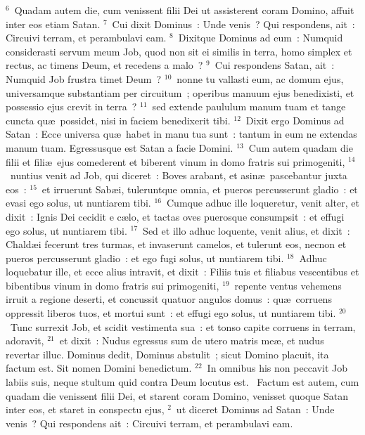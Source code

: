 ${}^{6}$~Quadam autem die, cum venissent filii Dei ut assisterent coram Domino, affuit inter eos etiam Satan.
${}^{7}$~Cui dixit Dominus~: Unde venis~? Qui respondens, ait~: Circuivi terram, et perambulavi eam.
${}^{8}$~Dixitque Dominus ad eum~: Numquid considerasti servum meum Job, quod non sit ei similis in terra, homo simplex et rectus, ac timens Deum, et recedens a malo~?
${}^{9}$~Cui respondens Satan, ait~: Numquid Job frustra timet Deum~?
${}^{10}$~nonne tu vallasti eum, ac domum ejus, universamque substantiam per circuitum~; operibus manuum ejus benedixisti, et possessio ejus crevit in terra~?
${}^{11}$~sed extende paululum manum tuam et tange cuncta qu\ae\ possidet, nisi in faciem benedixerit tibi.
${}^{12}$~Dixit ergo Dominus ad Satan~: Ecce universa qu\ae\ habet in manu tua sunt~: tantum in eum ne extendas manum tuam. Egressusque est Satan a facie Domini.
${}^{13}$~Cum autem quadam die filii et fili\ae\ ejus comederent et biberent vinum in domo fratris sui primogeniti,
${}^{14}$~nuntius venit ad Job, qui diceret~: Boves arabant, et asin\ae\ pascebantur juxta eos~:
${}^{15}$~et irruerunt Sab\ae i, tuleruntque omnia, et pueros percusserunt gladio~: et evasi ego solus, ut nuntiarem tibi.
${}^{16}$~Cumque adhuc ille loqueretur, venit alter, et dixit~: Ignis Dei cecidit e c\ae lo, et tactas oves puerosque consumpsit~: et effugi ego solus, ut nuntiarem tibi.
${}^{17}$~Sed et illo adhuc loquente, venit alius, et dixit~: Chald\ae i fecerunt tres turmas, et invaserunt camelos, et tulerunt eos, necnon et pueros percusserunt gladio~: et ego fugi solus, ut nuntiarem tibi.
${}^{18}$~Adhuc loquebatur ille, et ecce alius intravit, et dixit~: Filiis tuis et filiabus vescentibus et bibentibus vinum in domo fratris sui primogeniti,
${}^{19}$~repente ventus vehemens irruit a regione deserti, et concussit quatuor angulos domus~: qu\ae\ corruens oppressit liberos tuos, et mortui sunt~: et effugi ego solus, ut nuntiarem tibi.
${}^{20}$~Tunc surrexit Job, et scidit vestimenta sua~: et tonso capite corruens in terram, adoravit,
${}^{21}$~et dixit~: Nudus egressus sum de utero matris me\ae , et nudus revertar illuc. Dominus dedit, Dominus abstulit~; sicut Domino placuit, ita factum est. Sit nomen Domini benedictum.
${}^{22}$~In omnibus his non peccavit Job labiis suis, neque stultum quid contra Deum locutus est.
~\lettrine[lines=10,image=true,loversize=0.05,lraise=-0.03]{F}{}actum est autem, cum quadam die venissent filii Dei, et starent coram Domino, venisset quoque Satan inter eos, et staret in conspectu ejus,
${}^{2}$~ut diceret Dominus ad Satan~: Unde venis~? Qui respondens ait~: Circuivi terram, et perambulavi eam.
